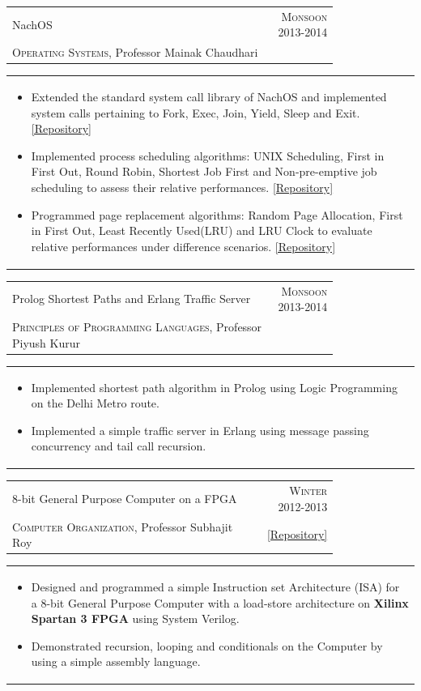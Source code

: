 \documentclass[a4paper,10pt]{article} %
\newcommand{\cproject}[5]{
    \begin{tabular}{p{0.80\linewidth}r}
        \textcolor{NavyBlue}{#2} & \multicolumn{1}{m{4cm}}{\raggedleft \textsc{#1}}\\
        #3 & #4
    \end{tabular}
    \begin{tabular}{p{\linewidth}}
    \vspace{-0.3cm}
        \footnotesize{#5}
    \end{tabular}
    \vspace{-0.5cm}
}
\begin{document}
\cproject
    {Monsoon 2013-2014}
    {NachOS}
    {\textsc{Operating Systems}, Professor Mainak Chaudhari}
    {}
    {
     \begin{itemize}[leftmargin=0.5cm]
         \item Extended the standard system call library of NachOS and implemented system calls pertaining to Fork, Exec,
             Join, Yield, Sleep and Exit.
             \href{https://github.com/srijanshetty/nachos-syscalls/}{[Repository]}
         \item Implemented process scheduling algorithms: UNIX Scheduling, First in First Out,
             Round Robin, Shortest Job First and Non-pre-emptive job scheduling to assess their relative performances.
             \href{https://github.com/srijanshetty/nachos-scheduling}{[Repository]}
         \item Programmed page replacement algorithms: Random Page Allocation, First in First Out,
             Least Recently Used(LRU) and LRU Clock to evaluate relative performances under difference scenarios.
             \href{https://github.com/srijanshetty/nachos-final/}{[Repository]}
      \end{itemize}
    }

\cproject
    {Monsoon 2013-2014}
    {Prolog Shortest Paths and Erlang Traffic Server}
    {\textsc{Principles of Programming Languages}, Professor Piyush Kurur}
    {}
    {
       \begin{itemize}[leftmargin=0.5cm]
           \item Implemented shortest path algorithm in Prolog using Logic Programming on the Delhi Metro route.
           \item Implemented a simple traffic server in Erlang using message passing concurrency and tail call recursion.
       \end{itemize}
    }

\cproject
    {Winter 2012-2013}
    {8-bit General Purpose Computer on a FPGA}
    {\textsc{Computer Organization}, Professor Subhajit Roy}
    { \href{https://github.com/srijanshetty/220\_y11} {\footnotesize{[Repository]}} }
    {
      \begin{itemize}[leftmargin=0.5cm]
          \item Designed and programmed a simple Instruction set Architecture (ISA) for a 8-bit General Purpose Computer with a load-store
              architecture on \textbf{Xilinx Spartan 3 FPGA} using System Verilog.
          \item Demonstrated recursion, looping and conditionals on the Computer by using a simple assembly language.
      \end{itemize}
    }
\end{document}
